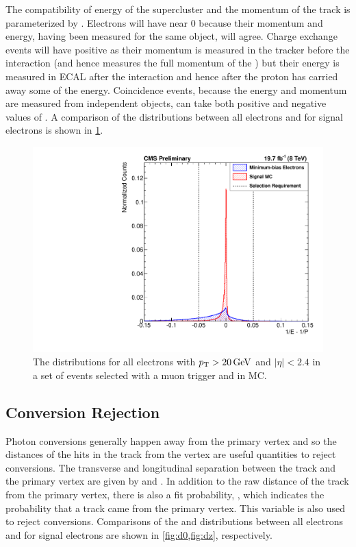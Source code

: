 The compatibility of energy of the supercluster and the momentum of the track
is parameterized by \ooeoop. Electrons will have \ooeoop near \num{0} because
their momentum and energy, having been measured for the same object, will
agree. Charge exchange events will have positive \ooeoop as their momentum is
measured in the tracker before the interaction (and hence measures the full
momentum of the \pionplus) but their energy is measured in ECAL after the
interaction and hence after the proton has carried away some of the energy.
Coincidence events, because the energy and momentum are measured from
independent objects, can take both positive and negative values of \ooeoop. A
comparison of the \ooeoop distributions between all electrons and for signal
electrons is shown in \cref{fig:ooeoop}.

\begin{figure}[!htbp]
    \centering
    \includegraphics[width=\StackedPlotWidth]{figures/e_reco_var_1oe_1op.pdf}
    \caption[
        Distributions of \ooeoop in data and MC.
    ]{
        The \ooeoop distributions for all electrons with $p_{\mathrm{T}} > 20 \,\text{Ge\hspace{-.08em}V}$ and
        $|\eta| < 2.4$ in a set of events selected with a muon trigger and in
        \MADGRAPH \Ztoee MC.
    }
    \label{fig:ooeoop}
\end{figure}

\subsection{Conversion Rejection}

Photon conversions generally happen away from the primary vertex and so the
distances of the hits in the track from the vertex are useful quantities to
reject conversions. The transverse and longitudinal separation between the
track and the primary vertex are given by \dzero and \dz. In addition to
the raw distance of the track from the primary vertex, there is also a fit
probability, \pvtx, which indicates the probability that a track came from the
primary vertex. This variable is also used to reject conversions. Comparisons
of the \dzero and \dz distributions between all electrons and for signal
electrons are shown in \cref{fig:d0,fig:dz}, respectively.

